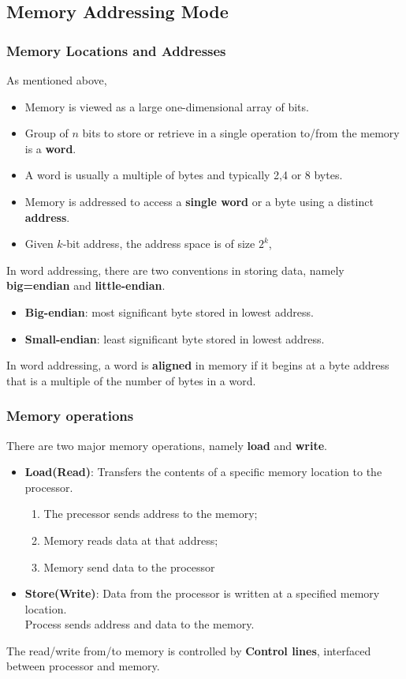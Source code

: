 \documentclass[12pt]{article}
\theoremstyle{definition}
\begin{document}
\subsection{Memory Addressing Mode}
\subsubsection{Memory Locations and Addresses}
As mentioned above,
\begin{itemize}
  \item Memory is viewed as a large one-dimensional array of bits.
  \item Group of $n$ bits to store or retrieve in a single operation to/from the memory is a \textbf{word}.
  \item A word is usually a multiple of bytes and typically 2,4 or 8 bytes.
  \item Memory is addressed to access a \textbf{single word} or a byte using a distinct \textbf{address}.
  \item Given $k$-bit address, the address space is of size $2^k$,
\end{itemize}
In word addressing, there are two conventions in storing data, namely \textbf{big=endian} and \textbf{little-endian}.
\begin{itemize}
  \item \textbf{Big-endian}: most significant byte stored in lowest address.
  \item \textbf{Small-endian}: least significant byte stored in lowest address.
\end{itemize}
In word addressing, a word is \textbf{aligned} in memory if it begins at a byte address that is a multiple of the number of bytes in a word.
\subsubsection{Memory operations}
There are two major memory operations, namely \textbf{load} and \textbf{write}.
\begin{itemize}
  \item \textbf{Load(Read)}: Transfers the contents of a specific memory location to the processor.
  \begin{enumerate}\item The precessor sends address to the memory; \item Memory reads data at that address; \item Memory send data to the processor\end{enumerate}
  \item \textbf{Store(Write)}: Data from the processor is written at a specified memory location.\\Process sends address and data to the memory.
\end{itemize} 
The read/write from/to memory is controlled by \textbf{Control lines}, interfaced between processor and memory.
\end{document}
